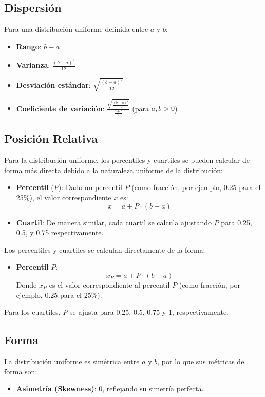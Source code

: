 \documentclass[11pt]{article}
\begin{document}
\subsection*{Dispersión}

Para una distribución uniforme definida entre \(a\) y \(b\):
\begin{itemize}
	\item \textbf{Rango}: \(b - a\)
	\item \textbf{Varianza}: \(\frac{(b - a)^2}{12}\)
	\item \textbf{Desviación estándar}: \(\sqrt{\frac{(b - a)^2}{12}}\)
	\item \textbf{Coeficiente de variación}: \(\frac{\sqrt{\frac{(b - a)^2}{12}}}{\frac{a + b}{2}}\) (para \(a, b > 0\))
\end{itemize}

\subsection*{Posición Relativa}
Para la distribución uniforme, los percentiles y cuartiles se pueden calcular de forma más directa debido a la naturaleza uniforme de la distribución:
\begin{itemize}
	\item \textbf{Percentil} (\(P\)): Dado un percentil \(P\) (como fracción, por ejemplo, 0.25 para el 25\%), el valor correspondiente \(x\) es:
	\[
	x = a + P \cdot (b - a)
	\]
	
	\item \textbf{Cuartil}: De manera similar, cada cuartil se calcula ajustando \(P\) para 0.25, 0.5, y 0.75 respectivamente.
\end{itemize}

Los percentiles y cuartiles se calculan directamente de la forma:
\begin{itemize}
	\item \textbf{Percentil} \(P\): 
	\[
	x_P = a + P \cdot (b - a)
	\]
	Donde \(x_P\) es el valor correspondiente al percentil \(P\) (como fracción, por ejemplo, 0.25 para el 25\%).
\end{itemize}
Para los cuartiles, \(P\) se ajusta para 0.25, 0.5, 0.75 y 1, respectivamente.


\subsection*{Forma}
La distribución uniforme es simétrica entre \(a\) y \(b\), por lo que sus métricas de forma son:
\begin{itemize}
	\item \textbf{Asimetría (Skewness)}: 0, reflejando su simetría perfecta.
\end{itemize}
\end{document}
